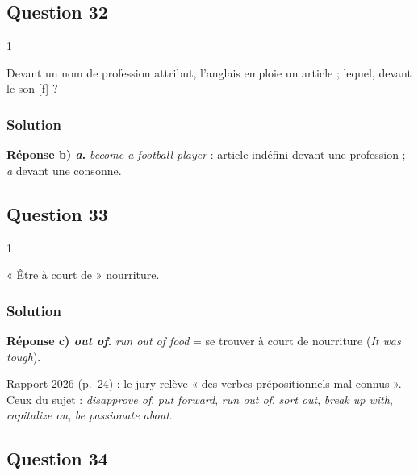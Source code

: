 \documentclass[11pt,a4paper]{article}
\begin{document}
\hypertarget{question-32}{%
\subsection{Question 32}\label{question-32}}

\begin{indication}{1}

Devant un nom de profession attribut, l'anglais emploie un article ; lequel, devant le son {[}f{]} ?

\end{indication}

\hypertarget{solution-31}{%
\subsubsection{Solution}\label{solution-31}}

\textbf{Réponse b) \emph{a}.} \emph{become a football player} : article indéfini devant une profession ; \emph{a} devant une consonne.

\hypertarget{question-33}{%
\subsection{Question 33}\label{question-33}}

\begin{indication}{1}

« Être à court de » nourriture.

\end{indication}

\hypertarget{solution-32}{%
\subsubsection{Solution}\label{solution-32}}

\textbf{Réponse c) \emph{out of}.} \emph{run out of food} = se trouver à court de nourriture (\emph{It was tough}).

\begin{jury}

Rapport 2026 (p.~24) : le jury relève « des verbes prépositionnels mal connus ». Ceux du sujet : \emph{disapprove of}, \emph{put forward}, \emph{run out of}, \emph{sort out}, \emph{break up with}, \emph{capitalize on}, \emph{be passionate about}.

\end{jury}

\hypertarget{question-34}{%
\subsection{Question 34}\label{question-34}}
\end{document}
